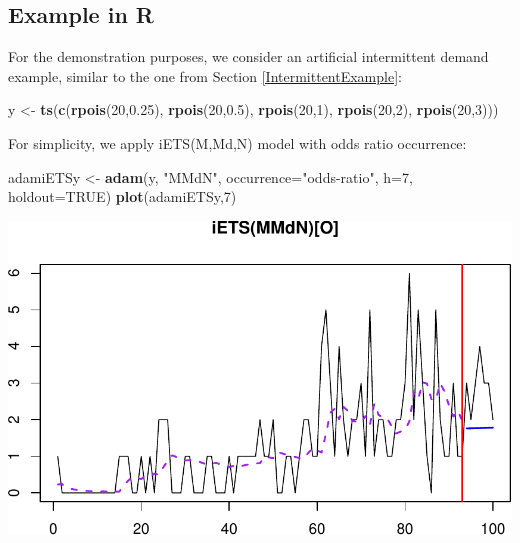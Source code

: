 \documentclass[]{book}
\newenvironment{Shaded}{\begin{snugshade}}{\end{snugshade}}
\newcommand{\DataTypeTok}[1]{\textcolor[rgb]{0.13,0.29,0.53}{#1}}
\newcommand{\DecValTok}[1]{\textcolor[rgb]{0.00,0.00,0.81}{#1}}
\newcommand{\FloatTok}[1]{\textcolor[rgb]{0.00,0.00,0.81}{#1}}
\newcommand{\KeywordTok}[1]{\textcolor[rgb]{0.13,0.29,0.53}{\textbf{#1}}}
\newcommand{\NormalTok}[1]{#1}
\newcommand{\OtherTok}[1]{\textcolor[rgb]{0.56,0.35,0.01}{#1}}
\newcommand{\StringTok}[1]{\textcolor[rgb]{0.31,0.60,0.02}{#1}}
\theoremstyle{definition}
\theoremstyle{definition}
\theoremstyle{definition}
\theoremstyle{definition}
\theoremstyle{remark}
\begin{document}
\hypertarget{forecastingADAMOtherExample}{%
\subsection{Example in R}\label{forecastingADAMOtherExample}}

For the demonstration purposes, we consider an artificial intermittent demand example, similar to the one from Section \ref{IntermittentExample}:

\begin{Shaded}
\begin{Highlighting}[]
\NormalTok{y <-}\StringTok{ }\KeywordTok{ts}\NormalTok{(}\KeywordTok{c}\NormalTok{(}\KeywordTok{rpois}\NormalTok{(}\DecValTok{20}\NormalTok{,}\FloatTok{0.25}\NormalTok{), }\KeywordTok{rpois}\NormalTok{(}\DecValTok{20}\NormalTok{,}\FloatTok{0.5}\NormalTok{), }\KeywordTok{rpois}\NormalTok{(}\DecValTok{20}\NormalTok{,}\DecValTok{1}\NormalTok{),}
          \KeywordTok{rpois}\NormalTok{(}\DecValTok{20}\NormalTok{,}\DecValTok{2}\NormalTok{), }\KeywordTok{rpois}\NormalTok{(}\DecValTok{20}\NormalTok{,}\DecValTok{3}\NormalTok{)))}
\end{Highlighting}
\end{Shaded}

For simplicity, we apply iETS(M,Md,N) model with odds ratio occurrence:

\begin{Shaded}
\begin{Highlighting}[]
\NormalTok{adamiETSy <-}\StringTok{ }\KeywordTok{adam}\NormalTok{(y, }\StringTok{"MMdN"}\NormalTok{, }\DataTypeTok{occurrence=}\StringTok{"odds-ratio"}\NormalTok{,}
                  \DataTypeTok{h=}\DecValTok{7}\NormalTok{, }\DataTypeTok{holdout=}\OtherTok{TRUE}\NormalTok{)}
\KeywordTok{plot}\NormalTok{(adamiETSy,}\DecValTok{7}\NormalTok{)}
\end{Highlighting}
\end{Shaded}

\includegraphics{Svetunkov--2022----ADAM_files/figure-latex/unnamed-chunk-155-1.pdf}
\end{document}

